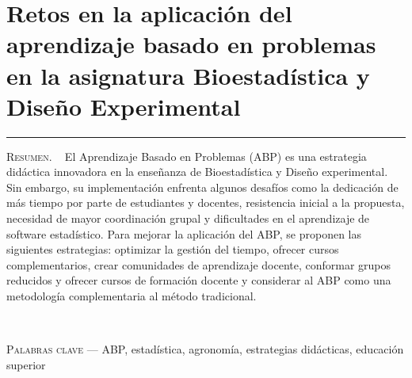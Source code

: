\thispagestyle{portadapage}
\setcounter{subsection}{0}
\setcounter{subsubsection}{0}
\setcounter{actividad}{0}
\setcounter{actividad_previa}{0}
\setcounter{actividad_entre}{0}
\renewcommand{\articulotipo}{Comunicación breve}
\renewcommand{\articulotitulo}{Retos en la aplicación del aprendizaje basado en problemas en la asignatura Bioestadística y Diseño Experimental}
\renewcommand{\articulotitulocorto}{Retos en la aplicación del aprendizaje basado en problemas en la asignatura Bioestadística y Diseño Experimental}
\section{\articulotitulo}

\noindent\rule{\linewidth}{2pt}

\vspace{0.25cm}

\begin{flushright}
	\vspace{1em}
\end{flushright}

\vspace{0.5cm}

\begin{center}
	\begin{minipage}{0.75\linewidth} \small
		\textsc{Resumen}. ~
		El Aprendizaje Basado en Problemas (ABP) es una estrategia didáctica innovadora en la enseñanza de Bioestadística y Diseño experimental. Sin embargo, su implementación enfrenta algunos desafíos como la dedicación de más tiempo por parte de estudiantes y docentes, resistencia inicial a la propuesta, necesidad de mayor coordinación grupal y dificultades en el aprendizaje de software estadístico. Para mejorar la aplicación del ABP, se proponen las siguientes estrategias: optimizar la gestión del tiempo, ofrecer cursos complementarios, crear comunidades de aprendizaje docente, conformar grupos reducidos y ofrecer cursos de formación docente y considerar al ABP como una metodología complementaria al método tradicional.
	\end{minipage}\\
	
	\vspace{0.5em}
	
	\begin{minipage}{0.75\linewidth} \small
	\textsc{Palabras clave} --- ABP, estadística, agronomía, estrategias didácticas, educación superior
	\end{minipage}
\end{center}

